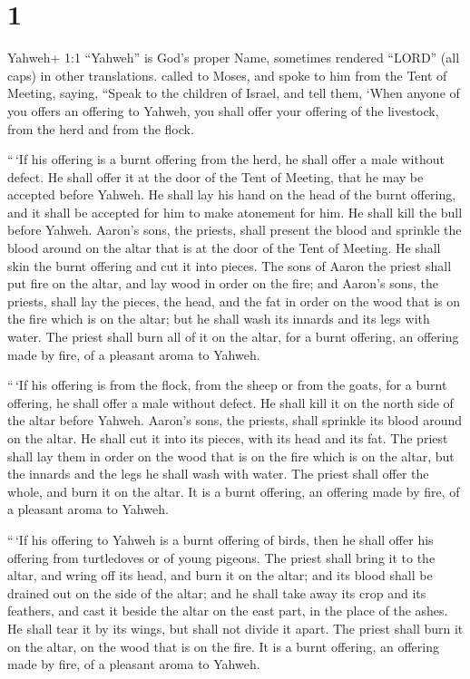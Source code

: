 \hypertarget{section}{%
\section{1}\label{section}}

 Yahweh+ 1:1 ``Yahweh'' is God's proper Name, sometimes
rendered ``LORD'' (all caps) in other translations. called to Moses, and
spoke to him from the Tent of Meeting, saying,  ``Speak to
the children of Israel, and tell them, `When anyone of you offers an
offering to Yahweh, you shall offer your offering of the livestock, from
the herd and from the flock.

 ``\,`If his offering is a burnt offering from the herd, he
shall offer a male without defect. He shall offer it at the door of the
Tent of Meeting, that he may be accepted before Yahweh.  He
shall lay his hand on the head of the burnt offering, and it shall be
accepted for him to make atonement for him.  He shall kill
the bull before Yahweh. Aaron's sons, the priests, shall present the
blood and sprinkle the blood around on the altar that is at the door of
the Tent of Meeting.  He shall skin the burnt offering and
cut it into pieces.  The sons of Aaron the priest shall put
fire on the altar, and lay wood in order on the fire;  and
Aaron's sons, the priests, shall lay the pieces, the head, and the fat
in order on the wood that is on the fire which is on the altar;
 but he shall wash its innards and its legs with water. The
priest shall burn all of it on the altar, for a burnt offering, an
offering made by fire, of a pleasant aroma to Yahweh.

 ``\,`If his offering is from the flock, from the sheep or
from the goats, for a burnt offering, he shall offer a male without
defect.  He shall kill it on the north side of the altar
before Yahweh. Aaron's sons, the priests, shall sprinkle its blood
around on the altar.  He shall cut it into its pieces, with
its head and its fat. The priest shall lay them in order on the wood
that is on the fire which is on the altar,  but the innards
and the legs he shall wash with water. The priest shall offer the whole,
and burn it on the altar. It is a burnt offering, an offering made by
fire, of a pleasant aroma to Yahweh.

 ``\,`If his offering to Yahweh is a burnt offering of
birds, then he shall offer his offering from turtledoves or of young
pigeons.  The priest shall bring it to the altar, and wring
off its head, and burn it on the altar; and its blood shall be drained
out on the side of the altar;  and he shall take away its
crop and its feathers, and cast it beside the altar on the east part, in
the place of the ashes.  He shall tear it by its wings, but
shall not divide it apart. The priest shall burn it on the altar, on the
wood that is on the fire. It is a burnt offering, an offering made by
fire, of a pleasant aroma to Yahweh.

